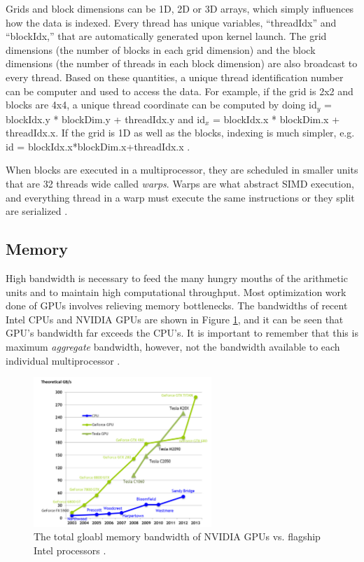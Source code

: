 Grids and block dimensions can be 1D, 2D or 3D arrays, which simply influences how the data is indexed.  Every thread has unique variables, ``threadIdx'' and ``blockIdx,'' that are automatically generated upon kernel launch.  The grid dimensions (the number of blocks in each grid dimension) and the block dimensions (the number of threads in each block dimension) are also broadcast to every thread.  Based on these quantities, a unique thread identification number can be computer and used to access the data.   For example, if the grid is 2x2 and blocks are 4x4, a unique thread coordinate can be computed by doing id$_y$ = blockIdx.y * blockDim.y + threadIdx.y and id$_x$ = blockIdx.x * blockDim.x + threadIdx.x.  If the grid is 1D as well as the blocks, indexing is much simpler, e.g. id = blockIdx.x*blockDim.x+threadIdx.x \cite{cuda}.

When blocks are executed in a multiprocessor, they are scheduled in smaller units that are 32 threads wide called \emph{warps}.  Warps are what abstract SIMD execution, and everything thread in a warp must execute the same instructions or they split are serialized \cite{cuda}.

\subsection{Memory}

High bandwidth is necessary to feed the many hungry mouths of the arithmetic units and to maintain high computational throughput.  Most optimization work done of GPUs involves relieving memory bottlenecks.  The bandwidths of recent Intel CPUs and NVIDIA GPUs are shown in Figure \ref{bandwidth}, and it can be seen that GPU's bandwidth far exceeds the CPU's.  It is important to remember that this is maximum \emph{aggregate} bandwidth, however, not the bandwidth available to each individual multiprocessor \cite{cuda}.   

\begin{figure}[h!] 
  \centering
    \includegraphics[width=0.6\textwidth]{graphics/memory_bandwidth.pdf}
     \caption{The total gloabl memory bandwidth of NVIDIA GPUs vs. flagship Intel processors \cite{cuda}. \label{bandwidth}}
\end{figure}

